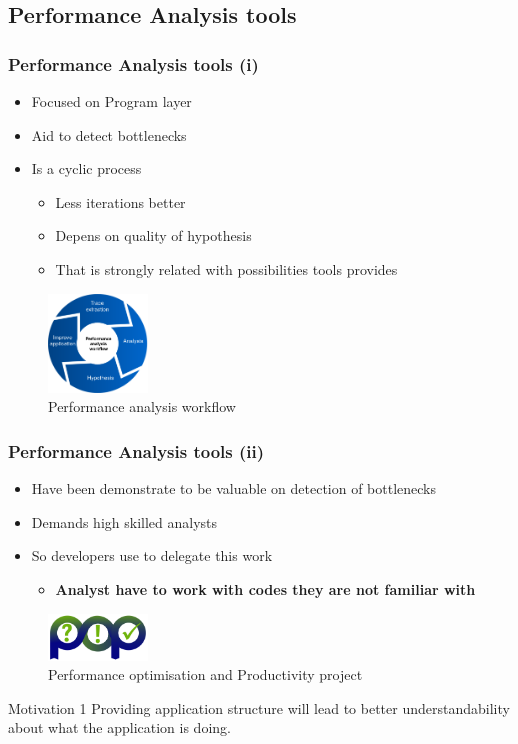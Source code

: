 \documentclass{beamer}
\begin{document}
\subsection{Performance Analysis tools}
\begin{frame}
\frametitle{Performance Analysis tools (i)}
\begin{itemize}
	\item Focused on Program layer
	\item Aid to detect bottlenecks
	\item Is a cyclic process
	\begin{itemize}
		\item Less iterations better
		\item Depens on quality of hypothesis
		\item That is strongly related with possibilities tools provides
	\end{itemize}
\end{itemize}
\begin{figure}
	\includegraphics[width=100px]{imgs/performance_analysis_diagram.png}
	\caption{Performance analysis workflow}
\end{figure}
\end{frame}

\begin{frame}
\frametitle{Performance Analysis tools (ii)}
\begin{itemize}
	\item Have been demonstrate to be valuable on detection of bottlenecks
	\item Demands high skilled analysts
	\item So developers use to delegate this work
	\begin{itemize}
		\item \textbf{Analyst have to work with codes they are not familiar with}
	\end{itemize}
\end{itemize}
\begin{figure}
	\includegraphics[width=100px]{imgs/pop.png}
	\caption{Performance optimisation and Productivity project}
\end{figure}
\pause
\begin{block}{Motivation 1}
	Providing application structure will lead to better understandability about what the application is doing.
\end{block}
\end{frame}
\end{document}
